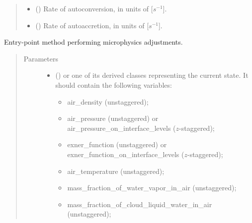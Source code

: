 \documentclass[letterpaper,10pt,english]{sphinxmanual}
\begin{document}
\begin{fulllineitems}
\begin{quote}
\begin{description}
\begin{itemize}
\item {} 
 () \textendash{} Rate of autoconversion, in units of {[}\(s^{-1}\){]}.

\item {} 
 () \textendash{} Rate of autoaccretion, in units of {[}\(s^{-1}\){]}.

\end{itemize}

\end{description}\end{quote}

\begin{fulllineitems}
\label{\detokenize{api:parameterizations.adjustment_microphysics_kessler_wrf.AdjustmentMicrophysicsKesslerWRF.__call__}}
Entry-point method performing microphysics adjustments.
\begin{quote}\begin{description}
\item[{Parameters}] \leavevmode\begin{itemize}
\item {} 
 () \textendash{} 
{\hyperref[\detokenize{api:storages.grid_data.GridData}]{}} or one of its derived classes representing the current state.
It should contain the following variables:
\begin{itemize}
\item {} 
air\_density (unstaggered);

\item {} 
air\_pressure (unstaggered) or air\_pressure\_on\_interface\_levels (\(z\)-staggered);

\item {} 
exner\_function (unstaggered) or exner\_function\_on\_interface\_levels (\(z\)-staggered);

\item {} 
air\_temperature (unstaggered);

\item {} 
mass\_fraction\_of\_water\_vapor\_in\_air (unstaggered);

\item {} 
mass\_fraction\_of\_cloud\_liquid\_water\_in\_air (unstaggered);


\end{itemize}
\end{itemize}
\end{description}
\end{quote}
\end{fulllineitems}
\end{fulllineitems}
\end{document}
